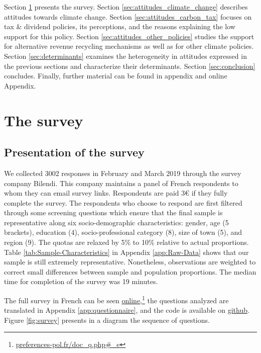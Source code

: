 \documentclass[english,5p,authoryear]{elsarticle}
\begin{document}
%

%

Section \ref{sec:survey} presents the survey. Section \ref{sec:attitudes_climate_change} describes attitudes towards climate change. Section \ref{sec:attitudes_carbon_tax} focuses on tax \& dividend policies, its perceptions, and the reasons explaining the low support for this policy. Section \ref{sec:attitudes_other_policies} studies the support for alternative revenue recycling mechanisms as well as for other climate policies. Section \ref{sec:determinants} examines the heterogeneity in attitudes expressed in the previous sections and characterize their determinants. Section \ref{sec:conclusion} concludes. Finally, further material can be found in appendix and online Appendix.

%

%

%

%


\section{The survey}\label{sec:survey}

    \subsection{Presentation of the survey}

We collected 3002 responses in February and March 2019 through the survey company Bilendi. This company maintains a panel of French respondents to whom they can email survey links. Respondents are
paid 3\euro{} if they fully complete the survey. The respondents who choose to respond are first filtered through some screening questions which ensure that the final sample is representative along six socio-demographic characteristics: gender, age (5 brackets), education (4), socio-professional category (8), size of town (5), and region (9). The quotas are relaxed by 5\% to 10\% relative to actual proportions. Table \ref{tab:Sample-Characteristics} in Appendix \ref{app:Raw-Data} shows that our sample is still extremely representative. Nonetheless, observations are weighted to correct small differences between sample and population proportions. The median time for completion of the survey was 19 minutes. 

The full survey in French can be seen \href{http://preferences-pol.fr/doc_q.php#_e}{online},\footnote{\href{http:\/\/preferences-pol.fr\/doc\_q.php\#\_e}{preferences-pol.fr/doc\_q.php\#\_e}} the questions analyzed are translated in Appendix \ref{app:questionnaire}, and the code is available on \href{https://github.com/bixiou/beliefs_climate_policies}{github}. Figure \ref{fig:survey} presents in a diagram the sequence of  questions.
\end{document}
